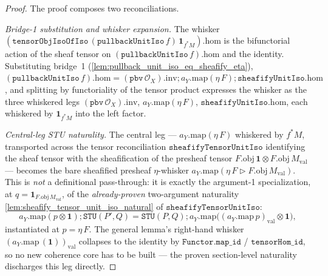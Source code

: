 \begin{proof}
  \leanok
  The proof composes two reconciliations.

  \emph{Bridge-1 substitution and whisker expansion.} The whisker
  \((\mathtt{tensorObjIsoOfIso}\,(\mathtt{pullbackUnitIso}\,f)\,\mathbf 1_{f^{*}M}).\mathrm{hom}\) is the
  bifunctorial action of the sheaf tensor on \((\mathtt{pullbackUnitIso}\,f).\mathrm{hom}\) and the
  identity. Substituting bridge~1 (\cref{lem:pullback_unit_iso_eq_sheafify_eta}),
  \((\mathtt{pullbackUnitIso}\,f).\mathrm{hom} = (\mathtt{pbv}\,\mathcal{O}_X).\mathrm{inv}
  \mathbin{;} a_Y.\mathrm{map}(\eta\,F) \mathbin{;} \mathtt{sheafifyUnitIso}.\mathrm{hom}\), and
  splitting by functoriality of the tensor product expresses the whisker as the three whiskered legs
  \((\mathtt{pbv}\,\mathcal{O}_X).\mathrm{inv}\), \(a_Y.\mathrm{map}(\eta\,F)\),
  \(\mathtt{sheafifyUnitIso}.\mathrm{hom}\), each whiskered by \(\mathbf 1_{f^{*}M}\) into the left
  factor.

  \emph{Central-leg STU naturality.} The central leg --- \(a_Y.\mathrm{map}(\eta\,F)\) whiskered by
  \(f^{*}M\), transported across the tensor reconciliation \(\mathtt{sheafifyTensorUnitIso}\)
  identifying the sheaf tensor with the sheafification of the presheaf tensor
  \(F.\mathrm{obj}\,\mathbf 1 \otimes F.\mathrm{obj}\,M_{\mathrm{val}}\) --- becomes the bare sheafified
  presheaf \(\eta\)-whisker \(a_Y.\mathrm{map}(\eta\,F \rhd F.\mathrm{obj}\,M_{\mathrm{val}})\). This is
  \emph{not} a definitional pass-through: it is exactly the argument-1 specialization, at
  \(q = \mathbf 1_{F.\mathrm{obj}\,M_{\mathrm{val}}}\), of the \emph{already-proven} two-argument
  naturality \cref{lem:sheafify_tensor_unit_iso_natural} of \(\mathtt{sheafifyTensorUnitIso}\):
  \[
    a_Y.\mathrm{map}(p \otimes \mathbf 1) \mathbin{;} \mathtt{STU}(P',Q)
      = \mathtt{STU}(P,Q) \mathbin{;} a_Y.\mathrm{map}\bigl((a_Y.\mathrm{map}\,p)_{\mathrm{val}} \otimes \mathbf 1\bigr),
  \]
  instantiated at \(p = \eta\,F\). The general lemma's right-hand whisker
  \((a_Y.\mathrm{map}\,(\mathbf 1))_{\mathrm{val}}\) collapses to the identity by
  \(\mathtt{Functor.map\_id}\) / \(\mathtt{tensorHom\_id}\), so no new coherence core has to be built ---
  the proven section-level naturality discharges this leg directly.


\end{proof}

